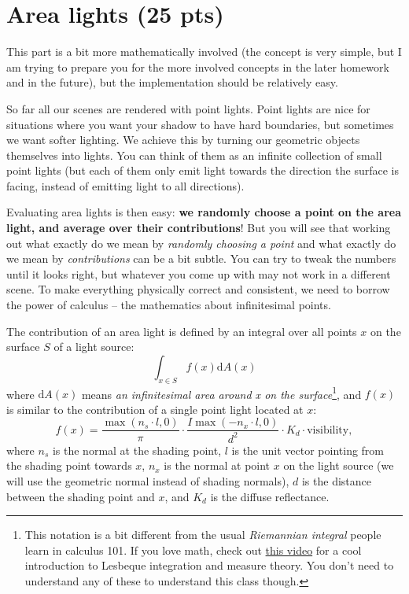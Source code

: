 \section{Area lights (25 pts)}
This part is a bit more mathematically involved (the concept is very simple, but I am trying to prepare you for the more involved concepts in the later homework and in the future), but the implementation should be relatively easy.

So far all our scenes are rendered with point lights. Point lights are nice for situations where you want your shadow to have hard boundaries, but sometimes we want softer lighting. We achieve this by turning our geometric objects themselves into lights. You can think of them as an infinite collection of small point lights (but each of them only emit light towards the direction the surface is facing, instead of emitting light to all directions).

Evaluating area lights is then easy: \textbf{we randomly choose a point on the area light, and average over their contributions}! But you will see that working out what exactly do we mean by \emph{randomly choosing a point} and what exactly do we mean by \emph{contributions} can be a bit subtle. You can try to tweak the numbers until it looks right, but whatever you come up with may not work in a different scene. To make everything physically correct and consistent, we need to borrow the power of calculus -- the mathematics about infinitesimal points.

The contribution of an area light is defined by an integral over all points $x$ on the surface $S$ of a light source:
\begin{equation}
	\int_{x \in S} f(x) \mathrm{d}A(x)
	\label{eq:area_light_integral}
\end{equation}
where $\mathrm{d}A(x)$ means \emph{an infinitesimal area around x on the surface}\footnote{This notation is a bit different from the usual \emph{Riemannian integral} people learn in calculus 101. If you love math, check out \href{https://www.youtube.com/watch?v=LDNDTOVnKJk}{this video} for a cool introduction to Lesbeque integration and measure theory. You don't need to understand any of these to understand this class though.}, and $f(x)$ is similar to the contribution of a single point light located at $x$:
\begin{equation}
    f(x) = \frac{\max\left(n_s \cdot l, 0\right)}{\pi} \cdot \frac{I \max\left(-n_x \cdot l, 0\right)}{d^2} \cdot K_d \cdot \text{visibility},
    \label{eq:area_light_integrand}
\end{equation}
where $n_s$ is the normal at the shading point, $l$ is the unit vector pointing from the shading point towards $x$, $n_x$ is the normal at point $x$ on the light source (we will use the geometric normal instead of shading normals), $d$ is the distance between the shading point and $x$, and $K_d$ is the diffuse reflectance.

